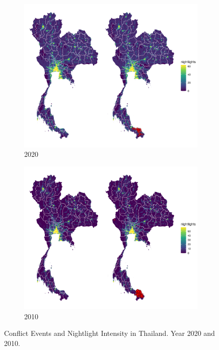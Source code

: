 \documentclass[12pt]{article}
\begin{document}
\begin{figure}[ht]
     \centering
     \begin{subfigure}[b]{0.45\textwidth}
         \centering
         \includegraphics[width=\textwidth]{map_thailand_2020.png}
         \caption{2020}
         \label{fig:thailand2020}
     \end{subfigure}
    \begin{subfigure}[b]{0.45\textwidth}
         \centering
         \includegraphics[width=\textwidth]{map_thailand_2010.png}
         \caption{2010}
         \label{fig:thailand2010}
    \end{subfigure}
    \caption{Conflict Events and Nightlight Intensity in Thailand. Year 2020 and 2010.}
    \label{fig:thailandmap}
\end{figure}
\end{document}
